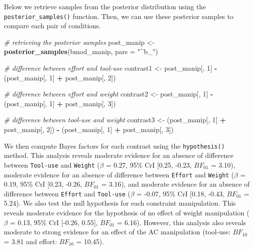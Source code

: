 \documentclass[floatsintext,doc]{apa6}
\newenvironment{Shaded}{\begin{snugshade}}{\end{snugshade}}
\newcommand{\CommentTok}[1]{\textcolor[rgb]{0.56,0.35,0.01}{\textit{#1}}}
\newcommand{\DataTypeTok}[1]{\textcolor[rgb]{0.13,0.29,0.53}{#1}}
\newcommand{\DecValTok}[1]{\textcolor[rgb]{0.00,0.00,0.81}{#1}}
\newcommand{\KeywordTok}[1]{\textcolor[rgb]{0.13,0.29,0.53}{\textbf{#1}}}
\newcommand{\NormalTok}[1]{#1}
\newcommand{\OperatorTok}[1]{\textcolor[rgb]{0.81,0.36,0.00}{\textbf{#1}}}
\newcommand{\StringTok}[1]{\textcolor[rgb]{0.31,0.60,0.02}{#1}}
\begin{document}
Below we retrieve samples from the posterior distribution using the \texttt{posterior\_samples()} function. Then, we can use these posterior samples to compare each pair of conditions.

\begin{Shaded}
\begin{Highlighting}[]
\CommentTok{# retrieving the posterior samples}
\NormalTok{post_manip <-}\StringTok{ }\KeywordTok{posterior_samples}\NormalTok{(bmod_manip, }\DataTypeTok{pars =} \StringTok{"^b_"}\NormalTok{)}

\CommentTok{# difference between effort and tool-use}
\NormalTok{contrast1 <-}\StringTok{ }\NormalTok{post_manip[, }\DecValTok{1}\NormalTok{]  }\OperatorTok{-}\StringTok{ }\NormalTok{(post_manip[, }\DecValTok{1}\NormalTok{] }\OperatorTok{+}\StringTok{ }\NormalTok{post_manip[, }\DecValTok{2}\NormalTok{])}

\CommentTok{# difference between effort and weight}
\NormalTok{contrast2 <-}\StringTok{ }\NormalTok{post_manip[, }\DecValTok{1}\NormalTok{]  }\OperatorTok{-}\StringTok{ }\NormalTok{(post_manip[, }\DecValTok{1}\NormalTok{] }\OperatorTok{+}\StringTok{ }\NormalTok{post_manip[, }\DecValTok{3}\NormalTok{])}

\CommentTok{# difference between tool-use and weight}
\NormalTok{contrast3 <-}\StringTok{ }\NormalTok{(post_manip[, }\DecValTok{1}\NormalTok{] }\OperatorTok{+}\StringTok{ }\NormalTok{post_manip[, }\DecValTok{2}\NormalTok{]) }\OperatorTok{-}\StringTok{ }\NormalTok{(post_manip[, }\DecValTok{1}\NormalTok{] }\OperatorTok{+}\StringTok{ }\NormalTok{post_manip[, }\DecValTok{3}\NormalTok{])}
\end{Highlighting}
\end{Shaded}

We then compute Bayes factors for each contrast using the \texttt{hypothesis()} method. This analysis reveals moderate evidence for an absence of difference between \texttt{Tool-use} and \texttt{Weight} (\(\beta\) = 0.27, 95\% CrI {[}0.25, -0.23, \(BF_{01}\) = 3.10), moderate evidence for an absence of difference between \texttt{Effort} and \texttt{Weight} (\(\beta\) = 0.19, 95\% CrI {[}0.23, -0.26, \(BF_{01}\) = 3.16), and moderate evidence for an absence of difference between \texttt{Effort} and \texttt{Tool-use} (\(\beta\) = -0.07, 95\% CrI {[}0.18, -0.43, \(BF_{01}\) = 5.24). We also test the null hypothesis for each constraint manipulation. This reveals moderate evidence for the hypothesis of no effect of weight manipulation (\(\beta\) = 0.13, 95\% CrI {[}-0.26, 0.55{]}, \(BF_{01}\) = 6.16). However, this analysis also reveals moderate to strong evidence for an effect of the AC manipulation (tool-use: \(BF_{10}\) = 3.81 and effort: \(BF_{10}\) = 10.45).
\end{document}
